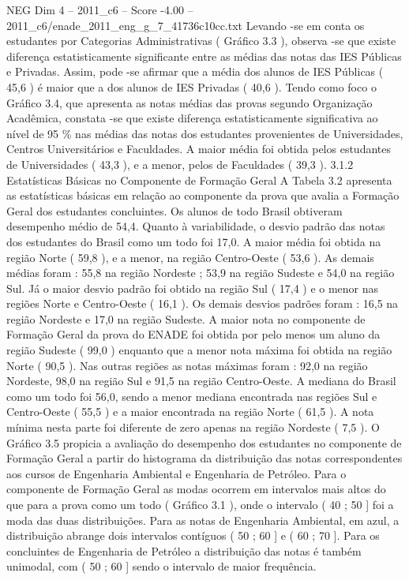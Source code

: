 \begin{textsample}{NEG Dim 4 – 2011\_c6 – Score -4.00 – 2011\_c6/enade\_2011\_eng\_g\_7\_41736c10cc.txt}
Levando -se em conta os estudantes por Categorias Administrativas ( Gráfico 3.3 ), observa -se que existe diferença estatisticamente significante entre as médias das notas das IES Públicas e Privadas.
Assim, pode -se afirmar que a média dos alunos de IES Públicas ( 45,6 ) é maior que a dos alunos de IES Privadas ( 40,6 ).
Tendo como foco o Gráfico 3.4, que apresenta as notas médias das provas segundo Organização Acadêmica, constata -se que existe diferença estatisticamente significativa ao nível de 95 \% nas médias das notas dos estudantes provenientes de Universidades, Centros Universitários e Faculdades.
A maior média foi obtida pelos estudantes de Universidades ( 43,3 ), e a menor, pelos de Faculdades ( 39,3 ). 3.1.2 Estatísticas Básicas no Componente de Formação Geral A Tabela 3.2 apresenta as estatísticas básicas em relação ao componente da prova que avalia a Formação Geral dos estudantes concluintes.
Os alunos de todo Brasil obtiveram desempenho médio de 54,4.
Quanto à variabilidade, o desvio padrão das notas dos estudantes do Brasil como um todo foi 17,0.
A maior média foi obtida na região Norte ( 59,8 ), e a menor, na região Centro-Oeste ( 53,6 ).
As demais médias foram : 55,8 na região Nordeste ; 53,9 na região Sudeste e 54,0 na região Sul.
Já o maior desvio padrão foi obtido na região Sul ( 17,4 ) e o menor nas regiões Norte e Centro-Oeste ( 16,1 ).
Os demais desvios padrões foram : 16,5 na região Nordeste e 17,0 na região Sudeste.
A maior nota no componente de Formação Geral da prova do ENADE foi obtida por pelo menos um aluno da região Sudeste ( 99,0 ) enquanto que a menor nota máxima foi obtida na região Norte ( 90,5 ).
Nas outras regiões as notas máximas foram : 92,0 na região Nordeste, 98,0 na região Sul e 91,5 na região Centro-Oeste.
A mediana do Brasil como um todo foi 56,0, sendo a menor mediana encontrada nas regiões Sul e Centro-Oeste ( 55,5 ) e a maior encontrada na região Norte ( 61,5 ).
A nota mínima nesta parte foi diferente de zero apenas na região Nordeste ( 7,5 ).
O Gráfico 3.5 propicia a avaliação do desempenho dos estudantes no componente de Formação Geral a partir do histograma da distribuição das notas correspondentes aos cursos de Engenharia Ambiental e Engenharia de Petróleo.
Para o componente de Formação Geral as modas ocorrem em intervalos mais altos do que para a prova como um todo ( Gráfico 3.1 ), onde o intervalo ( 40 ; 50 ] foi a moda das duas distribuições.
Para as notas de Engenharia Ambiental, em azul, a distribuição abrange dois intervalos contíguos ( 50 ; 60 ] e ( 60 ; 70 ].
Para os concluintes de Engenharia de Petróleo a distribuição das notas é também unimodal, com ( 50 ; 60 ] sendo o intervalo de maior frequência.

\end{textsample}
